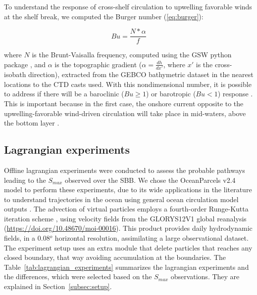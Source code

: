 \documentclass[draft]{agujournal2019}
\begin{document}
To understand the response of cross-shelf circulation to upwelling favorable winds at the shelf break, we computed the Burger number (\ref{eq:burger}):

\begin{linenomath*}
\begin{equation}
\label{eq:burger}
Bu = \frac{N*\alpha}{f}
\end{equation}
\end{linenomath*}

where $N$ is the Brunt-Vaisalla frequency, computed using the GSW python package \cite{firing2021gsw}, and $\alpha$ is the topographic gradient ($\alpha = \frac{dh}{dx'}$, where $x'$ is the cross-isobath direction), extracted from the GEBCO bathymetric dataset in the nearest locations to the CTD casts used. With this nondimensional number, it is possible to address if there will be a baroclinic ($Bu \geq 1$) or barotropic ($Bu < 1$) response \cite{clarke1985,LentzChapman2004}. This is important because in the first case, the onshore current opposite to the upwelling-favorable wind-driven circulation will take place in mid-waters, above the bottom layer \cite{LentzChapman2004}. 

\subsection{Lagrangian experiments}
Offline lagrangian experiments were conducted to assess the probable pathways leading to the \textit{$S_{max}$} observed over the SBB. We chose the OceanParcels v2.4 model \cite{delandmeter2019parcels} to perform these experiments, due to its wide applications in the literature to understand trajectories in  the ocean using general ocean circulation model outputs \cite{valles2022water,dawson2023pathways,seijo2023intrusions}. The advection of virtual particles employs a fourth-order Runge-Kutta iteration scheme \cite{delandmeter2019parcels}, using velocity fields from the GLORYS12V1 global reanalysis (\url{https://doi.org/10.48670/moi-00016}). This product provides daily hydrodynamic fields, in a 0.08$^o$ horizontal resolution, assimilating a large observational dataset. The experiment setup uses an extra module that delete particles that reaches any closed boundary, that way avoiding accumulation at the boundaries. The Table~\ref{tab:lagrangian_experiments} summarizes the lagrangian experiments and the differences, which were selected based on the \textit{$S_{max}$} observations. They are explained in Section~\ref{subsec:setup}.
\end{document}
